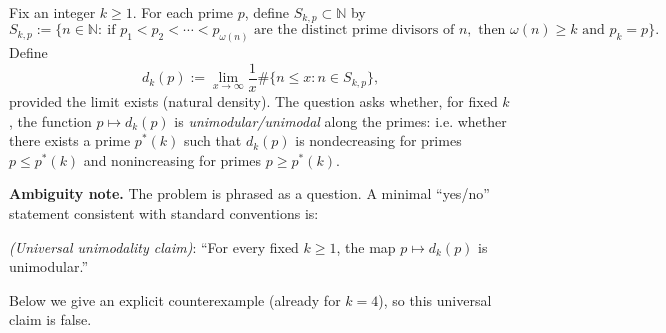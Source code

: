 Fix an integer $k\ge 1$. For each prime $p$, define $S_{k,p}\subset\mathbb{N}$ by
\[
S_{k,p}:=\{n\in\mathbb{N}:\ \text{if }p_1<p_2<\cdots<p_{\omega(n)}\text{ are the distinct prime divisors of }n,\text{ then }\omega(n)\ge k\text{ and }p_k=p\}.
\]
Define
\[
d_k(p):=\lim_{x\to\infty}\frac{1}{x}\#\{n\le x: n\in S_{k,p}\},
\]
provided the limit exists (natural density). The question asks whether, for fixed $k$, the function $p\mapsto d_k(p)$ is \emph{unimodular/unimodal} along the primes: i.e. whether there exists a prime $p^*(k)$ such that $d_k(p)$ is nondecreasing for primes $p\le p^*(k)$ and nonincreasing for primes $p\ge p^*(k)$. 

\medskip
\noindent\textbf{Ambiguity note.} The problem is phrased as a question. A minimal “yes/no” statement consistent with standard conventions is:

\smallskip
\noindent\emph{(Universal unimodality claim)}: “For every fixed $k\ge 1$, the map $p\mapsto d_k(p)$ is unimodular.”

\noindent Below we give an explicit counterexample (already for $k=4$), so this universal claim is false.
